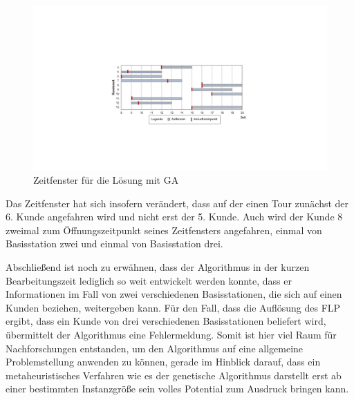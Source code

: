 \documentclass[a4paper,12pt,parskip,bibtotoc,liststotoc]{article}
\begin{document}
\begin{figure}[h!]
  \begin{center}
    \includegraphics[width=150mm]{zf2.jpg}
    \caption{Zeitfenster für die Lösung mit GA}  \label{Typen}
  \end{center}
\end{figure}

Das Zeitfenster hat sich insofern verändert, dass auf der einen Tour zunächst der 6. Kunde angefahren wird und nicht erst der 5. Kunde.
Auch wird der Kunde 8 zweimal zum Öffnungszeitpunkt seines Zeitfensters angefahren, einmal von Basisstation zwei und einmal von Basisstation drei.


Abschließend ist noch zu erwähnen, dass der Algorithmus in der kurzen Bearbeitungszeit lediglich so weit entwickelt werden konnte, dass er Informationen im Fall von zwei verschiedenen Basisstationen, die sich auf einen Kunden beziehen, weitergeben kann.
Für den Fall, dass die Auflösung des FLP ergibt, dass ein Kunde von drei verschiedenen Basisstationen beliefert wird, übermittelt der Algorithmus eine Fehlermeldung.
Somit ist hier viel Raum für Nachforschungen entstanden, um den Algorithmus auf eine allgemeine Problemstellung anwenden zu können, gerade im Hinblick darauf, dass ein metaheuristisches Verfahren wie es der genetische Algorithmus darstellt erst ab einer bestimmten Instanzgröße sein volles Potential zum Ausdruck bringen kann.



\newpage
\end{document}
